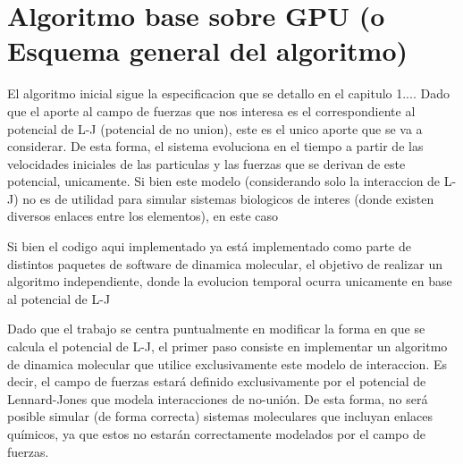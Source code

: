 \documentclass[a4paper,10pt]{report}
\begin{document}

\section{Algoritmo base sobre GPU (o Esquema general del algoritmo)}




El algoritmo inicial sigue la especificacion que se detallo en el capitulo 1....
Dado que el aporte al campo de fuerzas que nos interesa es el correspondiente al potencial de L-J (potencial de no union), este es el unico aporte que se va a considerar. De esta forma, el sistema evoluciona en el tiempo a partir de las velocidades iniciales de las particulas y las fuerzas que se derivan de este potencial, unicamente. Si bien este modelo (considerando solo la interaccion de L-J) no es de utilidad para simular sistemas biologicos de interes (donde existen diversos enlaces entre los elementos), en este caso 



Si bien el codigo aqui implementado ya está implementado como parte de distintos paquetes de software de dinamica molecular, el objetivo de realizar un algoritmo independiente, donde la evolucion temporal ocurra unicamente en base al potencial de L-J 

Dado que el trabajo se centra puntualmente en modificar la forma en que se calcula el potencial de L-J, el primer paso consiste en implementar un algoritmo de dinamica molecular que utilice exclusivamente este modelo de interaccion. 
Es decir, el campo de fuerzas estará definido exclusivamente por el potencial de Lennard-Jones que modela interacciones de no-unión. 
De esta forma, no será posible simular (de forma correcta) sistemas moleculares que incluyan enlaces químicos, ya que estos no estarán correctamente modelados por el campo de fuerzas. 
\end{document}
